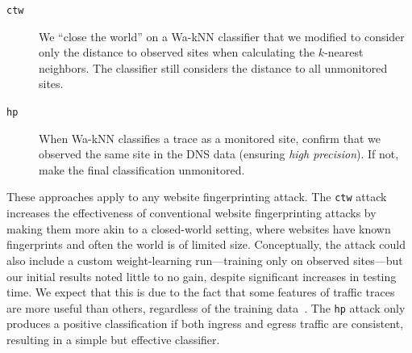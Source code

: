 \begin{description}
	\item[\texttt{ctw}] We ``close the world''
	on a Wa-kNN classifier that we modified to consider only the distance to
	observed sites when calculating the $k$-nearest neighbors.
	The classifier still considers the distance to all unmonitored sites.
	\item[\texttt{hp}] When Wa-kNN classifies a trace as a monitored site, confirm
	that we observed the same site in the DNS data (ensuring {\em high
	precision}). If not, make the final classification unmonitored.
\end{description}
\noindent
These approaches apply to any website fingerprinting attack. The
\texttt{ctw} attack increases the effectiveness of conventional website
fingerprinting attacks by making them more akin to a closed-world setting,
where websites have known fingerprints and often the world is of limited size.
Conceptually, the attack could also include
a custom weight-learning run---training only on observed sites---but our initial
results noted little to no gain, despite significant increases in
testing time.
We expect that this is due to the fact that some features of traffic traces are
more useful than others, regardless of the training data~\cite{Hayes2016a}.
The \texttt{hp} attack only produces a positive classification if both ingress
and egress traffic are consistent, resulting in a simple but effective
classifier.
